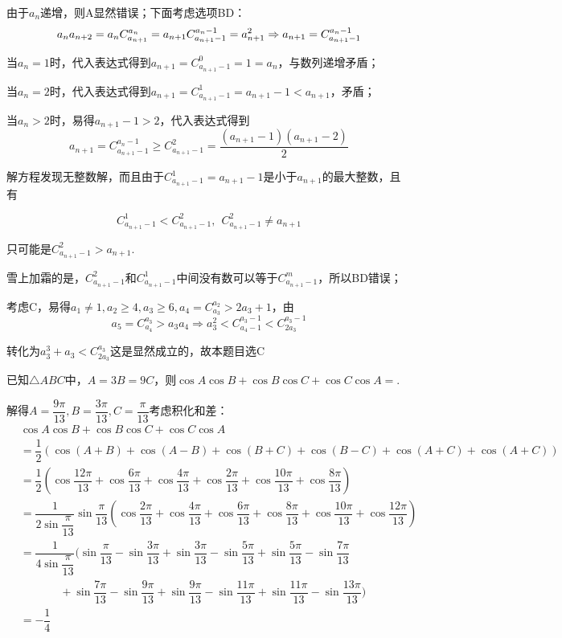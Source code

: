 \begin{solution}
由于$a_n$递增，则A显然错误；下面考虑选项BD：
\[
    a_na_{n+2} = a_nC_{a_{n+1}}^{a_{n}}=a_{n+1}C_{a_{n+1}-1}^{a_{n}-1}=a_{n+1}^2\\\Rightarrow a_{n+1}=C_{a_{n+1}-1}^{a_{n}-1}
\]

当$a_n=1$时，代入表达式得到$a_{n+1}=C_{a_{n+1}-1}^{0}=1=a_n$，与数列递增矛盾；

当$a_n=2$时，代入表达式得到$a_{n+1}=C_{a_{n+1}-1}^{1}=a_{n+1}-1<a_{n+1}$，矛盾；

当$a_n>2$时，易得$a_{n+1}-1>2$，代入表达式得到
\[a_{n+1}=C_{a_{n+1}-1}^{a_{n}-1}\ge C_{a_{n+1}-1}^{2}=\dfrac{(a_{n+1}-1)(a_{n+1}-2)}{2}\]

解方程发现无整数解，而且由于$C_{a_{n+1}-1}^{1}=a_{n+1}-1$是小于$a_{n+1}$的最大整数，且有

\[C_{a_{n+1}-1}^{1}<C_{a_{n+1}-1}^{2},~~C_{a_{n+1}-1}^{2}\ne a_{n+1}\]

只可能是$C_{a_{n+1}-1}^{2}> a_{n+1}$.

雪上加霜的是，$C_{a_{n+1}-1}^{2}$和$C_{a_{n+1}-1}^{1}$中间没有数可以等于$C_{a_{n+1}-1}^{m}$，所以BD错误；

考虑C，易得$a_1\ne1,a_2\ge 4,a_3\ge6,a_4=C_{a_3}^{a_2}>2a_3+1$，由
\[a_5=C_{a_4}^{a_3}>a_3a_4 \Rightarrow a_3^2<C_{a_{4}-1}^{a_{3}-1}<C_{2a_3}^{a_3-1}\]

转化为$a_3^3+a_3<C_{2a_3}^{a_3}$这是显然成立的，故本题目选C
\end{solution}
\begin{example}{}{}
    已知$\triangle{ABC}$中，$A=3B=9C$，则$\cos A\cos B+\cos B\cos C+\cos C\cos A=$\underline{\hspace{1cm}}.
\end{example}
\begin{solution}
解得$A=\dfrac{9\pi}{13},B=\dfrac{3\pi}{13},C=\dfrac{\pi}{13}$考虑积化和差：
\begin{align*}
&\cos A\cos B+\cos B\cos C+\cos C\cos A\\
&=\dfrac12(\cos(A+B)+\cos(A-B)+\cos(B+C)+\cos(B-C)+\cos(A+C)+\cos(A+C))\\
&=\dfrac12(\cos\dfrac{12\pi}{13}+\cos\dfrac{6\pi}{13}+\cos\dfrac{4\pi}{13}+\cos\dfrac{2\pi}{13}+\cos\dfrac{10\pi}{13}+\cos\dfrac{8\pi}{13})\\
&=\dfrac{1}{2\sin\dfrac{\pi}{13}}\sin\dfrac{\pi}{13}(\cos\dfrac{2\pi}{13}+\cos\dfrac{4\pi}{13}+\cos\dfrac{6\pi}{13}+\cos\dfrac{8\pi}{13}+\cos\dfrac{10\pi}{13}+\cos\dfrac{12\pi}{13})\\
&=\dfrac{1}{4\sin\dfrac{\pi}{13}}(\sin\dfrac{\pi}{13}-\sin\dfrac{3\pi}{13}+\sin\dfrac{3\pi}{13}-\sin\dfrac{5\pi}{13}+\sin\dfrac{5\pi}{13}-\sin\dfrac{7\pi}{13}\\
&~~~~~~~~~~~~~~~~+\sin\dfrac{7\pi}{13}-\sin\dfrac{9\pi}{13}+\sin\dfrac{9\pi}{13}-\sin\dfrac{11\pi}{13}+\sin\dfrac{11\pi}{13}-\sin\dfrac{13\pi}{13})\\
&=-\dfrac14
\end{align*}
\end{solution}
